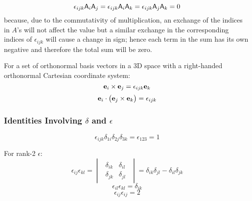 \begin{equation}
\epsilon_{ijk}\mathsf{A}_{i}\mathsf{A}_{j}=\epsilon_{ijk}\mathsf{A}_{i}\mathsf{A}_{k}=\epsilon_{ijk}\mathsf{A}_{j}\mathsf{A}_{k}=0\label{eqPermutingTwoFactors}
\end{equation}
because, due to the commutativity of multiplication, an exchange of
the indices in $A$'s will not affect the value but a similar exchange
in the corresponding indices of $\epsilon_{ijk}$ will cause a change
in sign; hence each term in the sum has its own negative and therefore
the total sum will be zero.

 For a set of orthonormal basis vectors in a 3D space with
a right-handed orthonormal Cartesian coordinate system:
\begin{equation}
\mathbf{ e}_{i}\times\mathbf{ e}_{j}=\epsilon_{ijk}\mathbf{ e}_{k}
\end{equation}
\begin{equation}
\mathbf{ e}_{i}\cdot\left(\mathbf{ e}_{j}\times\mathbf{ e}_{k}\right)=\epsilon_{ijk}
\end{equation}



\subsubsection{Identities Involving $\delta$ and $\epsilon$}


\begin{equation}
\epsilon_{ijk}\delta_{1i}\delta_{2j}\delta_{3k}=\epsilon_{123}=1
\end{equation}


 For rank-2 $\epsilon$:
\begin{equation}
\epsilon_{ij}\epsilon_{kl}=\begin{vmatrix}\begin{array}{cc}
\delta_{ik} & \delta_{il}\\
\delta_{jk} & \delta_{jl}
\end{array}\end{vmatrix}=\delta_{ik}\delta_{jl}-\delta_{il}\delta_{jk}
\end{equation}
\begin{equation}
\epsilon_{il}\epsilon_{kl}=\delta_{ik}
\end{equation}
\begin{equation}
\epsilon_{ij}\epsilon_{ij}=2
\end{equation}


